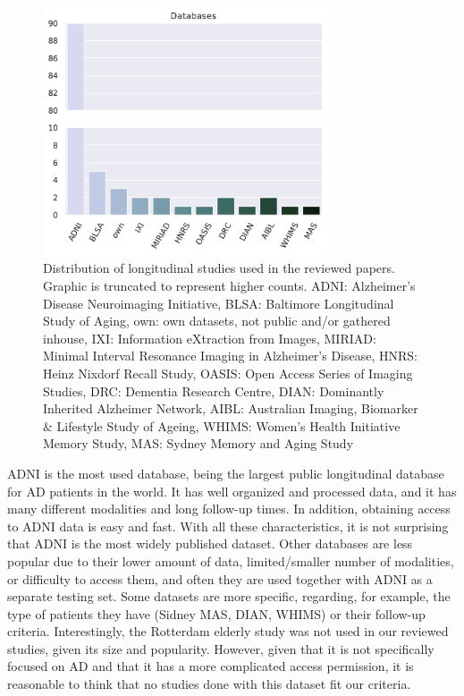 \begin{figure}[!htbp]
  \centering
  \includegraphics[width=0.75\textwidth]{figures/review/Fig5.pdf}
  \caption[Distribution of longitudinal studies used in the reviewed papers.]{\small Distribution of longitudinal studies used in the reviewed papers. Graphic is truncated to represent higher counts. ADNI: Alzheimer's Disease Neuroimaging Initiative, BLSA: Baltimore Longitudinal Study of Aging, own: own datasets, not public and/or gathered inhouse, IXI: Information eXtraction from Images, MIRIAD: Minimal Interval Resonance Imaging in Alzheimer's Disease, HNRS: Heinz Nixdorf Recall Study, OASIS: Open Access Series of Imaging Studies, DRC: Dementia Research Centre, DIAN: Dominantly Inherited Alzheimer Network, AIBL: Australian Imaging, Biomarker $\&$ Lifestyle Study of Ageing, WHIMS: Women's Health Initiative Memory Study, MAS: Sydney Memory and Aging Study}\label{fig:db}
\end{figure}

ADNI \cite{Weiner2017} is the most used database, being the largest public longitudinal database for AD patients in the world. It has well organized and processed data, and it has many different modalities and long follow-up times. In addition, obtaining access to ADNI data is easy and fast. With all these characteristics, it is not surprising that ADNI is the most widely published dataset. Other databases are less popular due to their lower amount of data, limited/smaller number of modalities, or difficulty to access them, and often they are used together with ADNI \cite{Davatzikos2009,Eshaghi2017,Franke2012} as a separate testing set. Some datasets are more specific, regarding, for example, the type of patients they have (Sidney MAS, DIAN, WHIMS) or their follow-up criteria. Interestingly, the Rotterdam elderly study \cite{Ikram2017} was not used in our reviewed studies, given its size and popularity. However, given that it is not specifically focused on AD and that it has a more complicated access permission, it is reasonable to think that no studies done with this dataset fit our criteria.  \\

